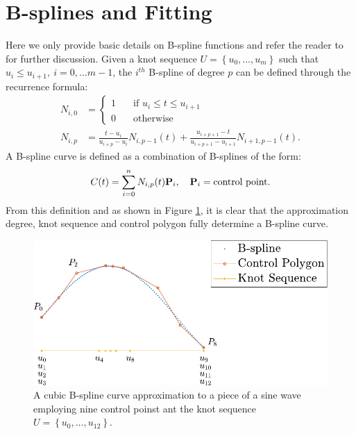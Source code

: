  \section{B-splines and Fitting}
 Here we only provide basic details on B-spline functions and refer the reader to 
 \cite{nurbs_book, deboor2001practical, schumaker2015spline} for further discussion. 
 Given a knot sequence $U=\left\{u_0,\ldots,u_m\right\}$ such that $u_i\leq u_{i+1},\  i=0,\ldots m-1$,
 the $i^{th}$ B-spline of degree $p$ can be defined through the recurrence formula:
 \begin{align}
 N_{i,0} &= \left\{ \begin{aligned}
                    1 \quad &\text{if } u_i\leq t\leq u_{i+1}\\
                    0 \quad &\text{otherwise }
                   \end{aligned}\right. \\
N_{i,p} &= \frac{t - u_i}{u_{i+p} - u_i}N_{i,p-1}(t) +  \frac{u_{i+p+1} - t}{u_{i+p+1} - u_{i+1}}N_{i+1,p-1}(t). 
 \end{align}
 A B-spline curve is defined as a combination of B-splines of the form:
 \begin{equation}
  C(t) = \sum_{i=0}^n N_{i,p}(t) \textbf P_i, \quad  \textbf P_i = \text{control point}.
 \end{equation}
From this definition and as shown in Figure \ref{fig:bspline_sine}, 
it is clear that the approximation degree, 
knot sequence and control polygon fully determine a B-spline curve.
\begin{figure}
 \centering
 \includegraphics[width =\textwidth]{sineBspline-crop}
 \caption{\label{fig:bspline_sine} A cubic B-spline curve approximation to a piece of a sine wave employing nine
 control poinst ant the knot sequence 
 $U=\left\{u_0,\dots,u_{12}\right\}$.}
\end{figure}


